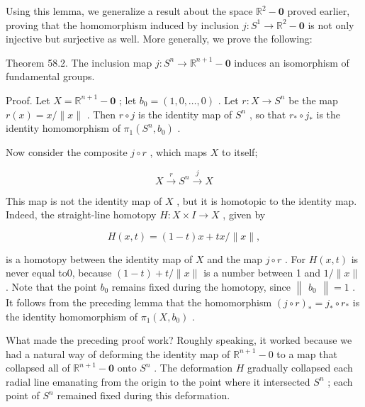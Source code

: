 Using this lemma, we generalize a result about the space \({\mathbb{R}}^{2} - \mathbf{0}\) proved earlier, proving that the homomorphism induced by inclusion \(j : {S}^{1} \rightarrow  {\mathbb{R}}^{2} - \mathbf{0}\) is not only injective but surjective as well. More generally, we prove the following:

Theorem 58.2. The inclusion map \(j : {S}^{n} \rightarrow  {\mathbb{R}}^{n + 1} - \mathbf{0}\) induces an isomorphism of fundamental groups.

Proof. Let \(X = {\mathbb{R}}^{n + 1} - \mathbf{0}\) ; let \({b}_{0} = \left( {1,0,\ldots ,0}\right)\) . Let \(r : X \rightarrow  {S}^{n}\) be the map \(r\left( x\right)  = x/\parallel x\parallel\) . Then \(r \circ  j\) is the identity map of \({S}^{n}\) , so that \({r}_{ * } \circ  {j}_{ * }\) is the identity homomorphism of \({\pi }_{1}\left( {{S}^{n},{b}_{0}}\right)\) .

Now consider the composite \(j \circ  r\) , which maps \(X\) to itself;

\[
X\overset{r}{ \rightarrow  }{S}^{n}\overset{j}{ \rightarrow  }X
\]

This map is not the identity map of \(X\) , but it is homotopic to the identity map. Indeed, the straight-line homotopy \(H : X \times  I \rightarrow  X\) , given by

\[
H\left( {x,t}\right)  = \left( {1 - t}\right) x + {tx}/\parallel x\parallel ,
\]

is a homotopy between the identity map of \(X\) and the map \(j \circ  r\) . For \(H\left( {x,t}\right)\) is never equal to0, because \(\left( {1 - t}\right)  + t/\parallel x\parallel\) is a number between 1 and \(1/\parallel x\parallel\) . Note that the point \({b}_{0}\) remains fixed during the homotopy, since \(\begin{Vmatrix}{b}_{0}\end{Vmatrix} = 1\) . It follows from the preceding lemma that the homomorphism \({\left( j \circ  r\right) }_{ * } = {j}_{ * } \circ  {r}_{ * }\) is the identity homomorphism of \({\pi }_{1}\left( {X,{b}_{0}}\right)\) .

What made the preceding proof work? Roughly speaking, it worked because we had a natural way of deforming the identity map of \({\mathbb{R}}^{n + 1} - 0\) to a map that collapsed all of \({\mathbb{R}}^{n + 1} - \mathbf{0}\) onto \({S}^{n}\) . The deformation \(H\) gradually collapsed each radial line emanating from the origin to the point where it intersected \({S}^{n}\) ; each point of \({S}^{n}\) remained fixed during this deformation.

